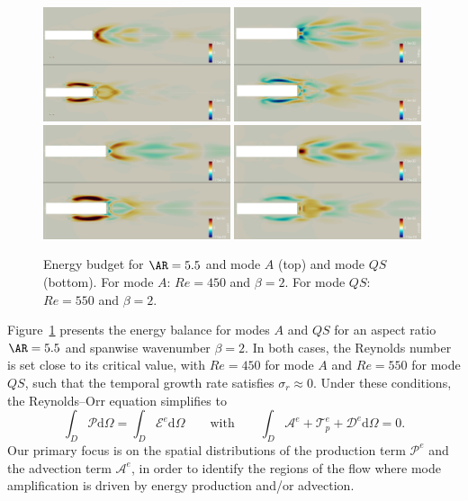 \begin{figure}
  \centering
  \includegraphics[width=0.49\textwidth]{./fig/AR5p5/Prod_Re450_Re550_beta2.png}
  \includegraphics[width=0.49\textwidth]{./fig/AR5p5/Mtrsp_Re450_Re550_beta2.png}
  \includegraphics[width=0.49\textwidth]{./fig/AR5p5/Prod1_Re450_Re550_beta2.png}
  \includegraphics[width=0.49\textwidth]{./fig/AR5p5/Prod2_Re450_Re550_beta2.png}
  \caption{Energy budget for $\AR=5.5$ and mode $A$ (top) and mode $QS$ (bottom). For mode $A$: $Re=450$ and $\beta=2$. For mode $QS$: $Re=550$ and $\beta=2$.}
  \label{fig:ener_budget}
\end{figure}


Figure~\ref{fig:ener_budget} presents the energy balance for modes $A$ and $QS$ for an aspect ratio $\AR = 5.5$ and spanwise wavenumber $\beta = 2$. In both cases, the Reynolds number is set close to its critical value, with $Re = 450$ for mode $A$ and $Re = 550$ for mode $QS$, such that the temporal growth rate satisfies $\sigma_r \approx 0$. Under these conditions, the Reynolds–Orr equation simplifies to
\begin{equation*}
 \int_{D} \mathcal{P} \text{d}\Omega = \int_{D} \mathcal{E}^e \text{d}\Omega \qquad \text{with} \qquad
 \int_{D} \mathcal{A}^e + \mathcal{T}_p^e + \mathcal{D}^e \text{d}\Omega = 0.
\end{equation*} 
%
Our primary focus is on the spatial distributions of the production term $\mathcal{P}^e$ and the advection term $\mathcal{A}^e$, in order to identify the regions of the flow where mode amplification is driven by energy production and/or advection.

